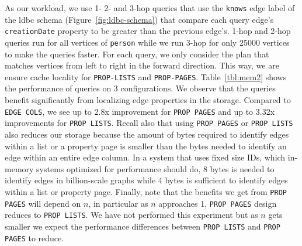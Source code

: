As our workload, we use 1- 2- and 3-hop queries that use the \texttt{knows} edge label of the \gls{ldbc} schema (Figure~\ref{fig:ldbc-schema}) that compare each query edge's \texttt{creationDate} property to be greater than the previous edge's. 1-hop and 2-hop queries run for all vertices of \texttt{person} while we run 3-hop for only 25000 vertices to make the queries faster. For each query, we only consider the plan that matches vertices from left to right in the forward direction. This way, we are ensure cache locality for \texttt{PROP-LISTS} and \texttt{PROP-PAGES}. Table~\ref{tbl:mem2} shows the performance of queries on 3 configurations. We observe that the queries benefit significantly from localizing edge properties in the storage. Compared to \texttt{EDGE COLS}, we see up to 2.8x improvement for \texttt{PROP PAGES} and up to 3.32x improvements for \texttt{PROP LISTS}. Recall also that using \texttt{PROP PAGES} or \texttt{PROP LISTS} also reduces our storage because the amount of bytes required to identify edges within a list or a property page is smaller than the bytes needed to identify an edge within an entire edge column. In a system that uses fixed size IDs, which in-memory systems optimized for performance should do, 8 bytes is needed to identify edges in billion-scale graphs while 4 bytes is sufficient to identify edges within a list or property page. Finally, note that the benefits we get from \texttt{PROP PAGES} will depend on $n$, in particular as $n$ approaches 1, \texttt{PROP PAGES} design reduces to \texttt{PROP LISTS}. We have not performed this experiment but as $n$ gets smaller we expect the performance differences between \texttt{PROP LISTS} and \texttt{PROP PAGES} to reduce.


